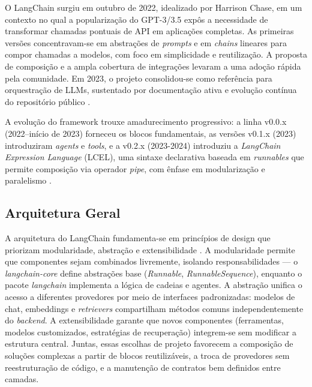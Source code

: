 \documentclass[12pt]{article}
\begin{document}
O LangChain surgiu em outubro de 2022, idealizado por Harrison Chase, em um contexto no qual a popularização do GPT-3/3.5 expôs a necessidade de transformar chamadas pontuais de API em aplicações completas. As primeiras versões concentravam-se em abstrações de \textit{prompts} e em \textit{chains} lineares para compor chamadas a modelos, com foco em simplicidade e reutilização. A proposta de composição e a ampla cobertura de integrações levaram a uma adoção rápida pela comunidade. Em 2023, o projeto consolidou-se como referência para orquestração de LLMs, sustentado por documentação ativa e evolução contínua do repositório público \cite{langchain2023docs, langchain2023github}.


A evolução do framework trouxe amadurecimento progressivo: a linha v0.0.x (2022–início de 2023) forneceu os blocos fundamentais, as versões v0.1.x (2023) introduziram \textit{agents} e \textit{tools}, e a v0.2.x (2023-2024) introduziu a \textit{LangChain Expression Language} (LCEL), uma sintaxe declarativa baseada em \textit{runnables} que permite composição via operador \textit{pipe}, com ênfase em modularização e paralelismo \cite{langchain2023docs}.

\subsection{Arquitetura Geral}
\label{subsec:arquitetura}


A arquitetura do LangChain fundamenta-se em princípios de design que priorizam modularidade, abstração e extensibilidade \cite{langchain2023docs}. A modularidade permite que componentes sejam combinados livremente, isolando responsabilidades — o \textit{langchain-core} define abstrações base (\textit{Runnable}, \textit{RunnableSequence}), enquanto o pacote \textit{langchain} implementa a lógica de cadeias e agentes. A abstração unifica o acesso a diferentes provedores por meio de interfaces padronizadas: modelos de chat, embeddings e \textit{retrievers} compartilham métodos comuns independentemente do \textit{backend}. A extensibilidade garante que novos componentes (ferramentas, modelos customizados, estratégias de recuperação) integrem-se sem modificar a estrutura central. Juntas, essas escolhas de projeto favorecem a composição de soluções complexas a partir de blocos reutilizáveis, a troca de provedores sem reestruturação de código, e a manutenção de contratos bem definidos entre camadas.
\end{document}
